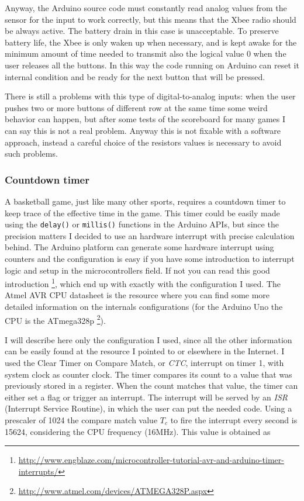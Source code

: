 \documentclass[11pt,english]{article}
\newcommand{\code}[1]{\texttt{#1}}
\begin{document}
Anyway, the Arduino source code must constantly read analog values from the sensor for the input to work correctly, 
but this means that the Xbee radio should be always active. The battery drain in this case is unacceptable.
To preserve battery life, the Xbee is only waken up when necessary, and is kept awake for the minimum amount of time 
needed to transmit also the logical value 0 when the user releases all the buttons. In this way the code running on 
Arduino can reset it internal condition and be ready for the next button that will be pressed. 
 
There is still a problems with this type of digital-to-analog inputs: when the user pushes two or more buttons 
of different row at the same time some weird behavior can happen, but after some tests of the scoreboard for many 
games I can say this is not a real problem. Anyway this is not fixable with a software approach, instead a careful
choice of the resistors values is necessary to avoid such problems. 



\subsubsection{Countdown timer} \label{subsubsec:timer}


A basketball game, just like many other sports, requires a countdown timer to keep trace of the effective 
time in the game. This timer could be easily made using the \code{delay()} or \code{millis()} functions 
in the Arduino APIs, but since the precision matters I decided to use an hardware interrupt with precise 
calculation behind. 
The Arduino platform can generate some hardware interrupt using counters and the configuration is easy if 
you have some introduction to interrupt logic and setup in the microcontrollers field. If not you can read 
this good introduction \footnote{\url{http://www.engblaze.com/microcontroller-tutorial-avr-and-arduino-timer-interrupts/}},
which end up with exactly with the configuration I used. The Atmel AVR CPU datasheet is the resource where 
you can find some more detailed information on the internals configurations (for the Arduino Uno the 
CPU is the ATmega328p \footnote{\url{http://www.atmel.com/devices/ATMEGA328P.aspx}}).   

I will describe here only the configuration I used, since all the other information can be easily found at the 
resource I pointed to or elsewhere in the Internet.
I used the Clear Timer on Compare Match, or \emph{CTC}, interrupt on timer 1, with system clock as counter clock.
The timer compares its count to a value that was previously stored in a register. When the count matches that 
value, the timer can either set a flag or trigger an interrupt. The interrupt will be served by an \emph{ISR} 
(Interrupt Service Routine), in which the user can put the needed code.
Using a prescaler of 1024 the compare match value $T_c$ to fire the interrupt every second is 15624, considering 
the CPU frequency (16MHz). This value is obtained as
\end{document}
